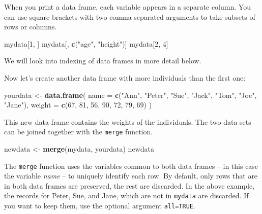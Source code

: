 \documentclass[
]{book}
\newenvironment{Shaded}{\begin{snugshade}}{\end{snugshade}}
\newcommand{\AttributeTok}[1]{\textcolor[rgb]{0.13,0.29,0.53}{#1}}
\newcommand{\DecValTok}[1]{\textcolor[rgb]{0.00,0.00,0.81}{#1}}
\newcommand{\FunctionTok}[1]{\textcolor[rgb]{0.13,0.29,0.53}{\textbf{#1}}}
\newcommand{\NormalTok}[1]{#1}
\newcommand{\OtherTok}[1]{\textcolor[rgb]{0.56,0.35,0.01}{#1}}
\newcommand{\StringTok}[1]{\textcolor[rgb]{0.31,0.60,0.02}{#1}}
\begin{document}
When you print a data frame, each variable appears in a separate
column. You can use square brackets with two comma-separated
arguments to take subsets of rows or columns.

\begin{Shaded}
\begin{Highlighting}[]
\NormalTok{mydata[}\DecValTok{1}\NormalTok{, ]}
\NormalTok{mydata[, }\FunctionTok{c}\NormalTok{(}\StringTok{"age"}\NormalTok{, }\StringTok{"height"}\NormalTok{)]}
\NormalTok{mydata[}\DecValTok{2}\NormalTok{, }\DecValTok{4}\NormalTok{]}
\end{Highlighting}
\end{Shaded}

We will look into indexing of data frames in more detail below.

Now let's create another data frame with more individuals than the
first one:

\begin{Shaded}
\begin{Highlighting}[]
\NormalTok{yourdata }\OtherTok{\textless{}{-}} \FunctionTok{data.frame}\NormalTok{(}
  \AttributeTok{name =} \FunctionTok{c}\NormalTok{(}\StringTok{"Ann"}\NormalTok{, }\StringTok{"Peter"}\NormalTok{, }\StringTok{"Sue"}\NormalTok{, }\StringTok{"Jack"}\NormalTok{, }\StringTok{"Tom"}\NormalTok{, }\StringTok{"Joe"}\NormalTok{, }\StringTok{"Jane"}\NormalTok{),}
  \AttributeTok{weight =} \FunctionTok{c}\NormalTok{(}\DecValTok{67}\NormalTok{, }\DecValTok{81}\NormalTok{, }\DecValTok{56}\NormalTok{, }\DecValTok{90}\NormalTok{, }\DecValTok{72}\NormalTok{, }\DecValTok{79}\NormalTok{, }\DecValTok{69}\NormalTok{)}
\NormalTok{)}
\end{Highlighting}
\end{Shaded}

This new data frame contains the weights of the individuals. The two
data sets can be joined together with the \texttt{merge} function.

\begin{Shaded}
\begin{Highlighting}[]
\NormalTok{newdata }\OtherTok{\textless{}{-}} \FunctionTok{merge}\NormalTok{(mydata, yourdata)}
\NormalTok{newdata}
\end{Highlighting}
\end{Shaded}

The \texttt{merge} function uses the variables common to both data
frames -- in this case the variable \emph{name} -- to uniquely identify
each row. By default, only rows that are in both data frames are
preserved, the rest are discarded. In the above example, the records
for Peter, Sue, and Jane, which are not in \texttt{mydata} are
discarded. If you want to keep them, use the optional argument \texttt{all=TRUE}.
\end{document}
